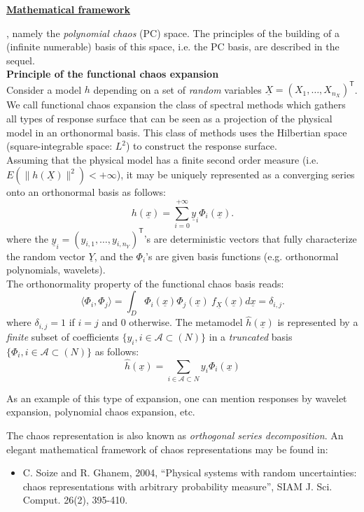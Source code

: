 {\underline{\textbf{Mathematical framework}} \vspace{2mm}

, namely the \emph{polynomial chaos} (PC) space. The principles of the building of a (infinite numerable) basis of this space, i.e. the PC basis, are described in the sequel. \\ 
\textbf{Principle of the functional chaos expansion}\\

Consider a model $h$ depending on a set of \emph{random} variables $\underline{X} = (X_1,\dots,X_{n_X})^{\textsf{T}}$. We call functional chaos expansion the class of spectral methods which gathers all types of response surface that can be seen as a projection of the physical model in an orthonormal basis. This class of methods uses the Hilbertian space (square-integrable space: $L^2$) to construct the response surface.\\

Assuming that the physical model has a finite second order measure (i.e. $E\left( \|h(\underline{X})\|^2\right)< + \infty$), it may be uniquely represented as a converging series onto an orthonormal basis as follows:
$$
  h(\underline{x})= \sum_{i=0}^{+\infty}  \underline{y}_{i}\Phi_{i}(\underline{x}).
$$   
where the $\underline{y}_{i} = (y_{i,1},\dots,y_{i,n_Y})^{\textsf{T}}$'s are deterministic vectors that fully characterize the random vector $\underline{Y}$, and the $\Phi_{i}$'s are given basis functions (e.g. orthonormal polynomials, wavelets). \\


The orthonormality property of the functional chaos basis reads:
  $$ 
    \langle \Phi_{i},\Phi_{j}\rangle = \int_{D}\Phi_{i}(\underline{x}) \Phi_{j}(\underline{x})~f_{\underline{X}}(\underline{x}) d \underline{x} = \delta_{i,j}.
  $$ 
  where $\delta_{i,j} =1$ if $i=j$ and 0 otherwise. The metamodel $\widehat{h}(\underline{x})$ is represented by a \emph{finite} subset of coefficients $\{y_{i}, i \in \mathcal{A} \subset (N)\}$ in a \emph{truncated} basis $\{\Phi_{i}, i \in \mathcal{A} \subset (N)\}$ as follows: 
  $$
    \widehat{h}(\underline{x})= \sum_{i \in \mathcal{A} \subset N}  y_{i}\Phi_{i}(\underline{x})
  $$ 


As an example of this type of expansion, one can mention responses by wavelet expansion, polynomial chaos expansion, etc.
}
{
}


\Methodology{}
{The chaos representation is also known as \emph{orthogonal series decomposition}. An elegant mathematical framework of chaos representations may be found in:
\begin{itemize}
  \item C. Soize and R. Ghanem, 2004, ``Physical systems with random uncertainties: chaos representations
with arbitrary probability measure'', SIAM J. Sci. Comput. 26(2), 395-410.
\end{itemize}
}
